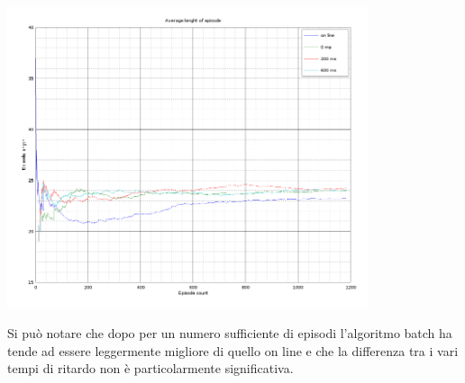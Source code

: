 \documentclass[a4paper,11pt]{article}
\begin{document}
\includegraphics[width=300pt]{episodes}

Si può notare che dopo per un numero sufficiente di episodi l'algoritmo batch ha tende ad essere leggermente migliore di quello on line e che la differenza tra i vari tempi di ritardo non è particolarmente significativa.
\end{document}
